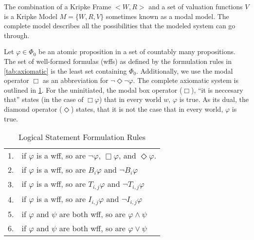 The combination of a Kripke Frame $< W,R >$ and a set of valuation functions ${V}$ is a Kripke Model $M = \{W, R, V\}$ sometimes known as a modal model. The complete model describes all the possibilities that the modeled system can go through.

Let $\varphi \in \Phi_0$ be an atomic proposition in a set of countably many propositions. The set of well-formed formulas (wffs) as defined by the formulation rules in \ref{tab:axiomatic} is the least set containing $\Phi_0$. Additionally, we use the modal operator $\Box$ as an abbreviation for $\neg \Diamond \neg \varphi$. The complete axiomatic system is outlined in \ref{tab:wffs}. For the uninitiated, the modal box operator ($\Box$), ``it is neccesary that'' states (in the case of $\Box \varphi$) that in every world $w$, $\varphi$ is true. As its dual, the diamond operator ($\Diamond$) states, that it is not the case that in every world, $\varphi$ is true.

\begin{table}[]
\small
\centering
\caption{Logical Statement Formulation Rules}
\begin{tabular}{r l}
1. & if $\varphi$ is a wff, so are $\neg \varphi$, $\Box \varphi$, and $\Diamond \varphi$. \\
2. & if $\varphi$ is a wff, so are $B_i \varphi$ and $\neg B_i \varphi$ \\
3. & if $\varphi$ is a wff, so are $T_{i,j} \varphi$ and $\neg T_{i,j} \varphi$ \\
4. & if $\varphi$ is a wff, so are $I_{i,j} \varphi$ and $\neg I_{i,j} \varphi$ \\
5. & if $\varphi$ and $\psi$ are both wff, so are $\varphi \wedge \psi$ \\
6. & if $\varphi$ and $\psi$ are both wff, so are $\varphi \vee \psi$ \\
\end{tabular}
\label{tab:wffs}
\end{table}

